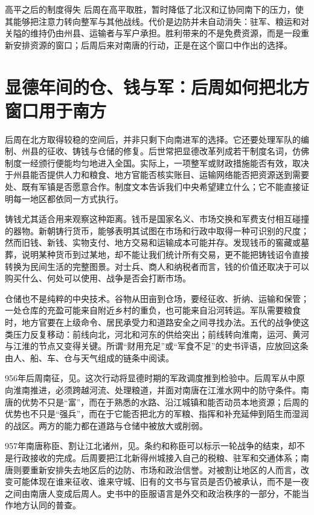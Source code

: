 \begin{causalchain}{高平之后的制度得失}
后周在高平取胜，暂时降低了北汉和辽协同南下的压力，使其能够把注意力转向整军与其他战线。代价是边防并未自动消失：驻军、粮运和对关隘的维持仍由州县、运输者与军户承担。胜利带来的不是免费资源，而是一段重新安排资源的窗口；后周后来对南唐的行动，正是在这个窗口中作出的选择。

\section{显德年间的仓、钱与军：后周如何把北方窗口用于南方}

后周在北方取得较稳的空间后，并非只剩下向南进军的选择。它还要处理军队的编制、州县的征收、铸钱与仓储的修复。后世常把显德改革列成若干制度名词，仿佛制度一经颁行便能均匀地进入全国。实际上，一项整军或财政措施能否有效，取决于州县能否提供人力和粮食、地方官能否核实账目、运输网络能否把资源送到需要处、既有军镇是否愿意合作。制度文本告诉我们中央希望建立什么；它不能直接证明每一地区都依同一方式执行。

铸钱尤其适合用来观察这种距离。钱币是国家名义、市场交换和军费支付相互碰撞的器物。新朝铸行货币，能够表明其试图在市场和行政中取得一种可识别的尺度；然而旧钱、新钱、实物支付、地方交易和运输成本可能并存。发现钱币的窖藏或墓葬，说明某种货币到过某地，却不能让我们统计所有交易，更不能把铸钱诏令直接转换为民间生活的完整图景。对士兵、商人和纳税者而言，钱的价值还取决于可以购买什么、何处可以使用、战争是否会打断市场。

仓储也不是纯粹的中央技术。谷物从田亩到仓场，要经征收、折纳、运输和保管；一处仓库的充盈可能来自附近乡村的重负，也可能来自沿河转运。军队需要粮食时，地方官要在上级命令、居民承受力和道路安全之间寻找办法。五代的战争使这类压力反复移动：前线向北，河北和河东的供给突出；前线转向淮南，运河、黄河与江淮的节点又变得关键。所谓“财用充足”或“军食不足”的史书评语，应放回这条由人、船、车、仓与天气组成的链条中阅读。

956年后周南征，见。这次行动将显德时期的军政调度推到检验中。后周军从中原向淮南推进，必须跨越河流、处理粮道，并面对南唐在江淮水网中的防守条件。南唐的优势不只是“富”，而在于熟悉的水路、沿江城镇和能否动员本地资源；后周的优势也不只是“强兵”，而在于它能否把北方的军粮、指挥和补充延伸到陌生而湿润的战区。两方的能力都在道路与仓储中被放大或削弱。

957年南唐称臣、割让江北诸州，见。条约和称臣可以标示一轮战争的结束，却不是行政接收的完成。后周要把江北新得州城接入自己的税粮、驻军和交通体系；南唐则要重新安排失去地区后的边防、市场和政治信誉。对被割让地区的人而言，改变可能体现在谁来征收、谁来守城、旧有的文书与官员是否仍被承认，而不是一夜之间由南唐人变成后周人。史书中的臣服语言是外交和政治秩序的一部分，不能当作地方认同的普查。


\end{causalchain}
